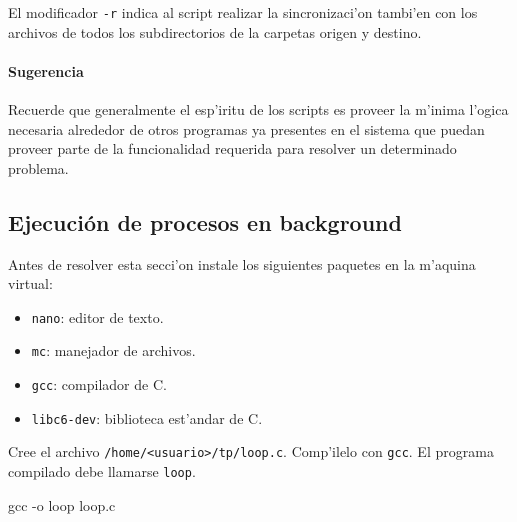 El modificador \texttt{-r} indica al script realizar la sincronizaci'on tambi'en con los archivos de todos los
subdirectorios de la carpetas origen y destino.


\paragraph{Sugerencia}

Recuerde que generalmente el esp'iritu de los scripts es proveer la m'inima l'ogica necesaria alrededor de otros programas
ya presentes en el sistema que puedan proveer parte de la funcionalidad requerida para resolver un determinado problema.

\subsection{Ejecuci\'on de procesos en background}

Antes de resolver esta secci'on instale los siguientes paquetes en la m'aquina virtual:

\begin{itemize}
\item \texttt{nano}: editor de texto.
\item \texttt{mc}: manejador de archivos.
\item \texttt{gcc}: compilador de C.
\item \texttt{libc6-dev}: biblioteca est'andar de C.
\end{itemize}

Cree el archivo \texttt{/home/<usuario>/tp/loop.c}. Comp'ilelo con \texttt{gcc}. El programa compilado debe llamarse
\texttt{loop}.

\begin{envRespuesta}
gcc -o loop loop.c
\end{envRespuesta}


